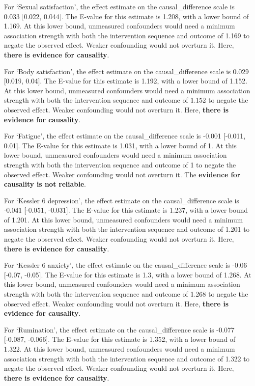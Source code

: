 \documentclass[
  single column]{article}
\begin{document}
For `Sexual satisfaction', the effect estimate on the causal\_difference
scale is 0.033 {[}0.022, 0.044{]}. The E-value for this estimate is
1.208, with a lower bound of 1.169. At this lower bound, unmeasured
confounders would need a minimum association strength with both the
intervention sequence and outcome of 1.169 to negate the observed
effect. Weaker confounding would not overturn it. Here, \textbf{there is
evidence for causality}.

For `Body satisfaction', the effect estimate on the causal\_difference
scale is 0.029 {[}0.019, 0.04{]}. The E-value for this estimate is
1.192, with a lower bound of 1.152. At this lower bound, unmeasured
confounders would need a minimum association strength with both the
intervention sequence and outcome of 1.152 to negate the observed
effect. Weaker confounding would not overturn it. Here, \textbf{there is
evidence for causality}.

For `Fatigue', the effect estimate on the causal\_difference scale is
-0.001 {[}-0.011, 0.01{]}. The E-value for this estimate is 1.031, with
a lower bound of 1. At this lower bound, unmeasured confounders would
need a minimum association strength with both the intervention sequence
and outcome of 1 to negate the observed effect. Weaker confounding would
not overturn it. The \textbf{evidence for causality is not reliable}.

For `Kessler 6 depression', the effect estimate on the
causal\_difference scale is -0.041 {[}-0.051, -0.031{]}. The E-value for
this estimate is 1.237, with a lower bound of 1.201. At this lower
bound, unmeasured confounders would need a minimum association strength
with both the intervention sequence and outcome of 1.201 to negate the
observed effect. Weaker confounding would not overturn it. Here,
\textbf{there is evidence for causality}.

For `Kessler 6 anxiety', the effect estimate on the causal\_difference
scale is -0.06 {[}-0.07, -0.05{]}. The E-value for this estimate is 1.3,
with a lower bound of 1.268. At this lower bound, unmeasured confounders
would need a minimum association strength with both the intervention
sequence and outcome of 1.268 to negate the observed effect. Weaker
confounding would not overturn it. Here, \textbf{there is evidence for
causality}.

For `Rumination', the effect estimate on the causal\_difference scale is
-0.077 {[}-0.087, -0.066{]}. The E-value for this estimate is 1.352,
with a lower bound of 1.322. At this lower bound, unmeasured confounders
would need a minimum association strength with both the intervention
sequence and outcome of 1.322 to negate the observed effect. Weaker
confounding would not overturn it. Here, \textbf{there is evidence for
causality}.
\end{document}

